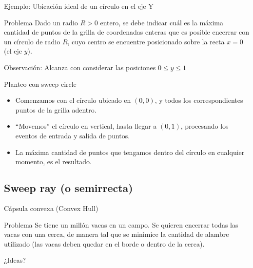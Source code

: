 \documentclass[compress]{beamer}
\newcommand{\bigpause}{\bigskip \pause}
\begin{document}
\begin{frame}{Ejemplo: Ubicación ideal de un círculo en el eje Y}

\begin{block}{Problema}
    Dado un radio $R > 0$ entero, se debe indicar cuál es la máxima cantidad de puntos de la grilla de coordenadas enteras que es posible encerrar con un círculo de radio $R$, cuyo centro se encuentre posicionado sobre la recta $x=0$ (el eje $y$).
\end{block}

\pause
{}
{
    Observación: Alcanza con considerar las posiciones $0 \leq y \leq 1$
}

\end{frame}

\begin{frame}{Planteo con sweep circle}

\begin{itemize}
    \item Comenzamos con el círculo ubicado en $(0,0)$, y todos los correspondientes puntos de la grilla adentro.
    \item ``Movemos'' el círculo en vertical, hasta llegar a $(0,1)$, procesando los eventos de entrada y salida de puntos.
    \item La máxima cantidad de puntos que tengamos dentro del círculo en cualquier momento, es el resultado.
\end{itemize}

\pause


\end{frame}

\subsection{Sweep ray (o semirrecta)}
\begin{frame}{C\'apsula convexa (Convex Hull)}
\begin{block}{Problema}
Se tiene un mill\'on vacas en un campo. Se quieren encerrar todas las vacas con una cerca, de manera tal que se minimice la cantidad de alambre utilizado (las vacas deben quedar en el borde o dentro de la cerca).
\end{block}

¿Ideas? \bigpause

\end{frame}
\end{document}

